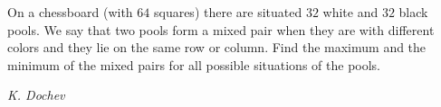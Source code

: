 On a chessboard (with $64$ squares) there are situated $32$ white and $32$ black pools. We say that two pools form a mixed pair when they are with different colors and they lie on the same row or column. Find the maximum and the minimum of the mixed pairs for all possible situations of the pools.

\textit{K. Dochev}